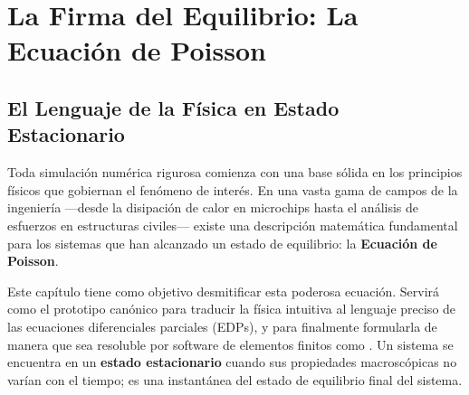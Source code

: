 \chapter{La Firma del Equilibrio: La Ecuación de Poisson}
\label{chap:poisson}

\section{El Lenguaje de la Física en Estado Estacionario}
\label{sec:poisson-intro}

Toda simulación numérica rigurosa comienza con una base sólida en los principios físicos que gobiernan el fenómeno de interés. En una vasta gama de campos de la ingeniería ---desde la disipación de calor en microchips hasta el análisis de esfuerzos en estructuras civiles--- existe una descripción matemática fundamental para los sistemas que han alcanzado un estado de equilibrio: la \textbf{Ecuación de Poisson}.

Este capítulo tiene como objetivo desmitificar esta poderosa ecuación. Servirá como el prototipo canónico para traducir la física intuitiva al lenguaje preciso de las ecuaciones diferenciales parciales (EDPs), y para finalmente formularla de manera que sea resoluble por software de elementos finitos como \fenics. Un sistema se encuentra en un \textbf{estado estacionario} cuando sus propiedades macroscópicas no varían con el tiempo; es una instantánea del estado de equilibrio final del sistema.


